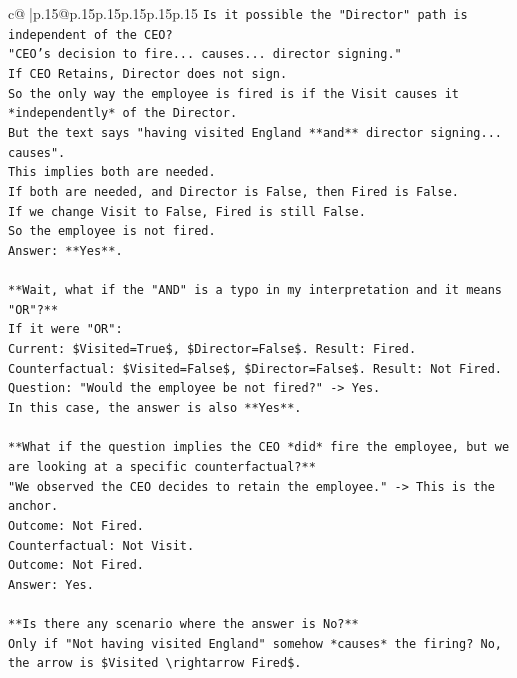 \documentclass{article}
\begin{document}
{\begin{supertabular}{c@{$\;$}|p{.15\linewidth}@{}p{.15\linewidth}p{.15\linewidth}p{.15\linewidth}p{.15\linewidth}p{.15\linewidth}}
{{{\texttt{Is it possible the "Director" path is independent of the CEO?} \\
\texttt{"CEO's decision to fire... causes... director signing."} \\
\texttt{If CEO Retains, Director does not sign.} \\
\texttt{So the only way the employee is fired is if the Visit causes it *independently* of the Director.} \\
\texttt{But the text says "having visited England **and** director signing... causes".} \\
\texttt{This implies both are needed.} \\
\texttt{If both are needed, and Director is False, then Fired is False.} \\
\texttt{If we change Visit to False, Fired is still False.} \\
\texttt{So the employee is not fired.} \\
\texttt{Answer: **Yes**.} \\
\\ 
\texttt{**Wait, what if the "AND" is a typo in my interpretation and it means "OR"?**} \\
\texttt{If it were "OR":} \\
\texttt{Current: \$Visited=True\$, \$Director=False\$. Result: Fired.} \\
\texttt{Counterfactual: \$Visited=False\$, \$Director=False\$. Result: Not Fired.} \\
\texttt{Question: "Would the employee be not fired?" {-}> Yes.} \\
\texttt{In this case, the answer is also **Yes**.} \\
\\ 
\texttt{**What if the question implies the CEO *did* fire the employee, but we are looking at a specific counterfactual?**} \\
\texttt{"We observed the CEO decides to retain the employee." {-}> This is the anchor.} \\
\texttt{Outcome: Not Fired.} \\
\texttt{Counterfactual: Not Visit.} \\
\texttt{Outcome: Not Fired.} \\
\texttt{Answer: Yes.} \\
\\ 
\texttt{**Is there any scenario where the answer is No?**} \\
\texttt{Only if "Not having visited England" somehow *causes* the firing? No, the arrow is \$Visited \textbackslash{}rightarrow Fired\$.} \\
}}}
\end{supertabular}}
\end{document}
